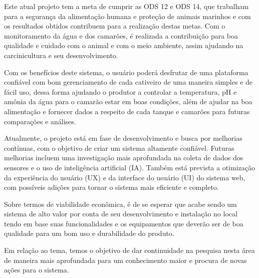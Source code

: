 Este atual projeto tem a meta de cumprir as ODS 12 e ODS 14, que trabalham para a segurança da alimentação humana e proteção de animais marinhos e com os resultados obtidos contribuem para a realização destas metas. Com o monitoramento da água e dos camarões, é realizada a contribuição para boa qualidade e cuidado com o animal e com o meio ambiente, assim ajudando na carcinicultura e seu desenvolvimento.

Com os benefícios deste sistema, o usuário poderá desfrutar de uma plataforma confiável com bom gerenciamento de cada cativeiro de uma maneira simples e de fácil uso, dessa forma ajudando o produtor a controlar a temperatura, pH e amônia da água para o camarão estar em boas condições, além de ajudar na boa alimentação e fornecer dados a respeito de cada tanque e camarões para futuras comparações e análises.

Atualmente, o projeto está em fase de desenvolvimento e busca por melhorias contínuas, com o objetivo de criar um sistema altamente confiável. Futuras melhorias incluem uma investigação mais aprofundada na coleta de dados dos sensores e o uso de inteligência artificial (IA). Também está prevista a otimização da experiência do usuário (UX) e da interface do usuário (UI) do sistema web, com possíveis adições para tornar o sistema mais eficiente e completo.

Sobre termos de viabilidade econômica, é de se esperar que acabe sendo um sistema de alto valor por conta de seu desenvolvimento e instalação no local tendo em base suas funcionalidades e os equipamentos que deverão ser de boa qualidade para um bom uso e durabilidade do produto.

Em relação ao tema, temos o objetivo de dar continuidade na pesquisa nesta área de maneira mais aprofundada para um conhecimento maior e procura de novas ações para o sistema.

